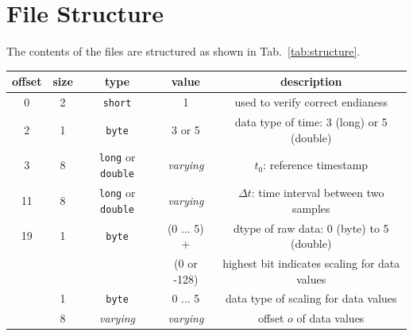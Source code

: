 \documentclass[a4paper,10pt]{article}
\begin{document}
\section{File Structure}\label{sec:file_structure}
The contents of the files are structured as shown in Tab.~\ref{tab:structure}.
\begin{table}[htbp]
 \centering
 \begin{tabular}{|c|c|c|c|c|}
    \hline
    offset  & size             & type                             & value                  & description \\
    \hline                                                                                        
    0       & 2                & \texttt{short}                   & 1                      & used to verify correct endianess  \\
    \hline                                                                                        
    2       & 1                & \texttt{byte}                    & 3 or 5                 & data type of time: 3 (long) or 5 (double) \\
    \hline                                                                                        
    3       & 8                & \texttt{long} or \texttt{double} & \textit{varying}       & $t_0$: reference timestamp \\
    \hline                                                                                        
    11      & 8                & \texttt{long} or \texttt{double} & \textit{varying}       & $\Delta t$: time interval between two samples \\
    \hline                            
    19      & 1                & \texttt{byte}                    & (0 ... 5) +            & dtype of raw data: 0 (byte) to 5 (double) \\
     ~      & ~                &      ~                           & (0 or -128)            & highest bit indicates scaling for data values \\
    \hline                                                               
    [20]    & 1                & \texttt{byte}                    & 0 ... 5                & data type of scaling for data values \\
    \hline                            
    [21]    & 8                & \textit{varying}                 & \textit{varying}       & offset $o$ of data values \\
    \hline                                                                                        

\end{tabular}
\end{table}
\end{document}
